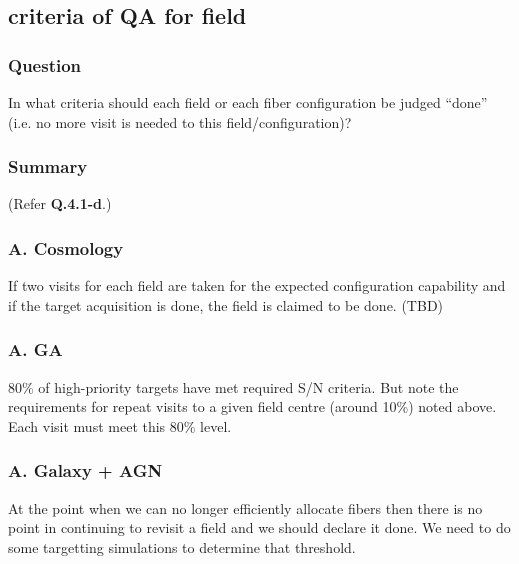 \documentclass[a4paper,notitlepage]{article}
\begin{document}
\subsection{criteria of QA for field}

\subsubsection{Question}
In what criteria should each field or each fiber configuration
      be judged ``done'' (i.e. no more visit is needed to this
      field/configuration)?

\subsubsection{Summary}

(Refer {\bf Q.4.1-d}.)

\subsubsection{A. Cosmology}
If two visits for each field are taken for the expected
configuration capability and if the target acquisition is done, the
field is claimed to be done. (TBD)


\subsubsection{A. GA}

80\% of high-priority targets have met required S/N criteria.  But
note the requirements for repeat visits to a given field centre
(around 10\%) noted above. Each visit must meet this 80\% level.

\subsubsection{A. Galaxy + AGN}
At the point when we can no longer efficiently allocate fibers then
there is no point in continuing to revisit a field and we should
declare it done.  We need to do some targetting simulations 
to determine that threshold.


\end{document}
